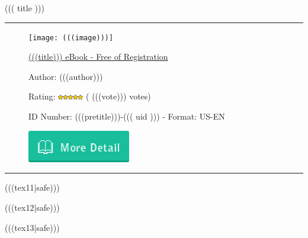 \documentclass{article}
\newcommand{\garis}{\rule{\linewidth}{0.5mm}}
\begin{document}
{\color{blue}\noindent\huge{((( title )))}}

\noindent\garis


\begin{figure}[!htb]
    \begin{minipage}{.3\textwidth}
        \texttt{[image: (((image)))]}
    \end{minipage}%
    \begin{minipage}{0.7\textwidth}


      \href{http://(((domain)))/download/(((title|replace(' ', '-')))).pdf}{(((title))) eBook - Free of Registration}

      \vspace{12pt}

      Author: (((author)))

      \vspace{12pt}

      Rating: \includegraphics[width=0.1\textwidth]{rating.png} ( (((vote))) votes)

      \vspace{12pt}

      ID Number: (((pretitle)))-((( uid ))) - Format: US-EN

      \vspace{12pt}

      \href{http://(((domain)))/download/(((title|replace(' ', '-')))).pdf}{\includegraphics[width=0.4\textwidth]{button.jpg}}

    \end{minipage}
\end{figure}

\noindent\garis

\vspace{12pt}

(((tex11|safe)))

(((tex12|safe)))

(((tex13|safe)))

\vspace{24pt}
\end{document}

